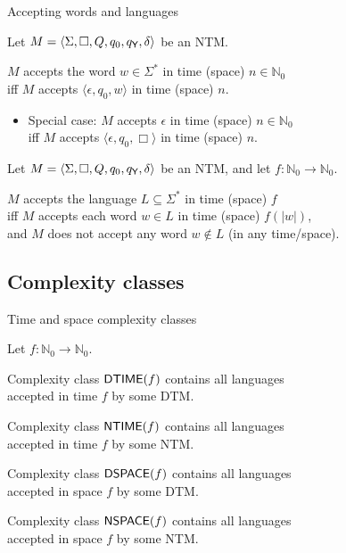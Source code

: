 \documentclass{gkibeamer}
\begin{document}
\begin{frame}{Accepting words and languages}
  \begin{definition}
    Let $M = \langle \Sigma, \Box, Q, q_0, q_{\textsf{Y}}, \delta\rangle$
    be an NTM.

    \smallskip

    $M$ \alert{accepts the word $w \in \Sigma^*$
      in time (space) $n \in \mathbb N_0$} \\
    iff $M$ accepts $\langle\epsilon, q_0, w\rangle$ in time (space) $n$.
    \begin{itemize}
    \item Special case: $M$ accepts $\epsilon$ in time (space)
      $n \in \mathbb N_0$ \\
      iff $M$ accepts $\langle\epsilon, q_0, \Box\rangle$ in time
      (space) $n$.
    \end{itemize}
  \end{definition}

  \begin{definition}
    Let $M = \langle \Sigma, \Box, Q, q_0, q_{\textsf{Y}}, \delta\rangle$
    be an NTM, and let $f: \mathbb N_0 \to \mathbb N_0$.

    \smallskip
    
    $M$ \alert{accepts the language $L \subseteq \Sigma^*$
      in time (space) $f$} \\
    iff $M$ accepts each word $w \in L$ in time (space) $f(|w|)$, \\
    and $M$ does not accept any word $w \notin L$ (in any time/space).
  \end{definition}
\end{frame}

\subsection{Complexity classes}

\begin{frame}{Time and space complexity classes}
    \begin{definition}[\dtime, \ntime, \dspace, \nspace]
    Let $f: \mathbb N_0 \to \mathbb N_0$.

    \smallskip

    Complexity class \alert{$\textsf{\textup{DTIME}}(f)$} contains all languages \\
    accepted in time $f$ by some DTM.

    \smallskip

    Complexity class \alert{$\textsf{\textup{NTIME}}(f)$} contains all languages \\
    accepted in time $f$ by some NTM.

    \smallskip

    Complexity class \alert{$\textsf{\textup{DSPACE}}(f)$} contains all languages \\
    accepted in space $f$ by some DTM.

    \smallskip

    Complexity class \alert{$\textsf{\textup{NSPACE}}(f)$} contains all languages \\
    accepted in space $f$ by some NTM.
    \end{definition}
\end{frame}
\end{document}
